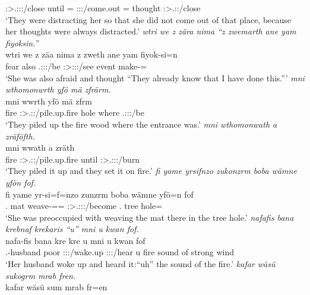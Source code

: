 \begin{exe}
	\Stpl:\Sbj>\Tsg.\Obj:\Io:\Nonpast:\Ipfv/close until \Dem{} \Recog=\Char{} \Neg{} \Sg:\Sbj:\Pst:\Dur/come.out \Recog=\Char{} thought \Iam{} \Stpl:\Sbj>\Tsg.\F:\Io:\Iter/close\\
	\trans `They were distracting her so that she did not come out of that place, because her thoughts were always distracted.'
	\emph{wtri we z zära nima ``z zwemarth ane yam fiyoksin.''}\\
	\gll wtri we z zäa nima z zweth ane yam fiyok-si=n\\
	fear also \Iam{} \Tsg.\F:\Sbj:\Pst:\Ipfv/be \Quot{} \Iam{} \Stpl:\Sbj>\Fsg:\Obj:\Rpst:\Pfv/see \Dem{} event make-\Nmlz=\Loc\\
	\trans `She was also afraid and thought ``They already know that I have done this.'''
	\emph{mni wthomonwrth yfö mä zfrärm.}\\
	\gll mni wwrth yfö mä zfrm\\
	fire \Stpl:\Sbj>\Tsg.\F:\Nonpast:\Ipfv/pile.up.fire hole where \Tsg.\F:\Sbj:\Pst:\Dur/be\\
	\trans `They piled up the fire wood where the entrance was.'
	\emph{mni wthomonwath a zräföfth.}\\
	\gll mni wwath a zräth\\
	fire \Stpl:\Sbj>\Tsg.\F:\Pst:\Ipfv/pile.up.fire until \Stpl:\Sbj>\Tsg.\F:\Obj:\Irr:\Pfv/burn\\
	\trans `They piled it up and they set it on fire.'
	\emph{fi yame yrsifnzo zukonzrm boba wämne yfön fof.}\\
	\gll fi yame yr-si=f=nzo zunzrm boba wämne yfö=n fof\\
	\Third.\Abs{} mat weave-\Nmlz=\Erg=\Only{} \Sg:\Sbj>\Tsg.\F:\Obj:\Pst:\Dur/become \Med.\Abl{} tree hole=\Loc{} \Emph{}\\
	\trans `She was preoccupied with weaving the mat there in the tree hole.'
	\emph{nafafis bana krebnaf krekaris ``u'' mni u kwan fof.}\\
	\gll nafa-fis bana kre kre u mni {u kwan} fof\\
	\Third.\Poss-husband poor \Stsg:\Sbj:\Irr:\Pfv/wake.up \Stsg:\Sbj:\Irr:\Pfv/hear u fire {sound of strong wind} \Emph\\
	\trans `Her husband woke up and heard it:``uh'' the sound of the fire.'
	\emph{kafar wäsü sukogrm mrab fren.}\\
	\gll kafar wäsü sum mrab fr=en\\

\end{exe}
